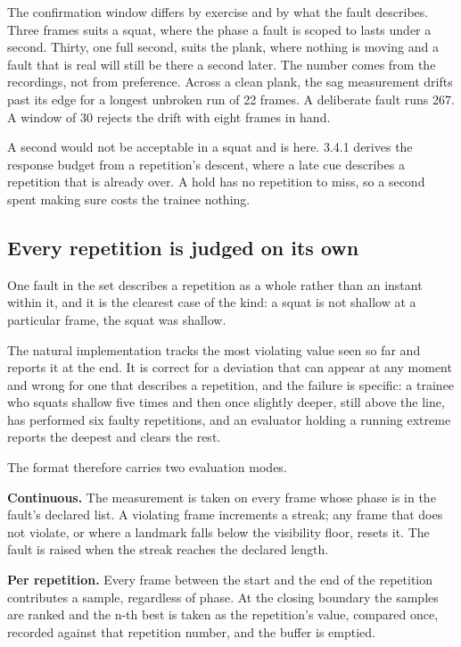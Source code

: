The confirmation window differs by exercise and by what the fault describes. Three frames suits a squat, where the phase a fault is scoped to lasts under a second. Thirty, one full second, suits the plank, where nothing is moving and a fault that is real will still be there a second later. The number comes from the recordings, not from preference. Across a clean plank, the sag measurement drifts past its edge for a longest unbroken run of 22 frames. A deliberate fault runs 267. A window of 30 rejects the drift with eight frames in hand.

A second would not be acceptable in a squat and is here. 3.4.1 derives the response budget from a repetition's descent, where a late cue describes a repetition that is already over. A hold has no repetition to miss, so a second spent making sure costs the trainee nothing.

\subsection{Every repetition is judged on its own}
\label{sec:6.4.1}

One fault in the set describes a repetition as a whole rather than an instant within it, and it is the clearest case of the kind: a squat is not shallow at a particular frame, the squat was shallow.

The natural implementation tracks the most violating value seen so far and reports it at the end. It is correct for a deviation that can appear at any moment and wrong for one that describes a repetition, and the failure is specific: a trainee who squats shallow five times and then once slightly deeper, still above the line, has performed six faulty repetitions, and an evaluator holding a running extreme reports the deepest and clears the rest.

The format therefore carries two evaluation modes.

\textbf{Continuous.} The measurement is taken on every frame whose phase is in the fault's declared list. A violating frame increments a streak; any frame that does not violate, or where a landmark falls below the visibility floor, resets it. The fault is raised when the streak reaches the declared length.

\textbf{Per repetition.} Every frame between the start and the end of the repetition contributes a sample, regardless of phase. At the closing boundary the samples are ranked and the n-th best is taken as the repetition's value, compared once, recorded against that repetition number, and the buffer is emptied.

